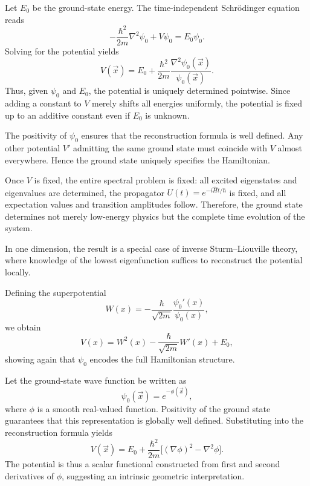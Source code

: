 Let $E_0$ be the ground-state energy. The time-independent Schr\"odinger equation reads
\begin{equation}
-\frac{\hbar^2}{2m}\nabla^2\psi_0 + V\psi_0 = E_0\psi_0.
\end{equation}
Solving for the potential yields
\begin{equation}
    \label{pot1d}
V(\vec{x}) = E_0 + \frac{\hbar^2}{2m}\frac{\nabla^2\psi_0(\vec{x})}{\psi_0(\vec{x})}.
\end{equation}
Thus, given $\psi_0$ and $E_0$, the potential is uniquely determined
pointwise. Since adding a constant to $V$ merely shifts all energies
uniformly, the potential is fixed up to an additive constant even if
$E_0$ is unknown.

The positivity of $\psi_0$ ensures that the reconstruction formula is
well defined. Any other potential $V'$ admitting the same ground 
state must coincide with $V$ almost everywhere. Hence the ground 
state uniquely specifies the Hamiltonian.

Once $V$ is fixed, the entire spectral problem is fixed: all excited
eigenstates and eigenvalues are determined, the propagator 
$U(t)=e^{-i\hat H t/\hbar}$ is fixed, and all expectation values
and transition amplitudes follow. Therefore, the ground state 
determines not merely low-energy physics but the complete time 
evolution of the system.

In one dimension, the result is a special case of inverse 
Sturm--Liouville theory, where knowledge of the lowest 
eigenfunction suffices to reconstruct the potential locally.

Defining the superpotential
\begin{equation}
W(x) = -\frac{\hbar}{\sqrt{2m}}\frac{\psi_0'(x)}{\psi_0(x)},
\end{equation}
we obtain
\begin{equation}
V(x) = W^2(x) - \frac{\hbar}{\sqrt{2m}}W'(x) + E_0,
\end{equation}
showing again that $\psi_0$ encodes the full Hamiltonian structure.


Let the ground-state wave function be written as
\begin{equation}
\psi_0(\vec{x}) = e^{-\phi(\vec{x})},
\end{equation}
where $\phi$ is a smooth real-valued function. Positivity of the ground state 
guarantees that this representation is globally well defined. Substituting 
into the reconstruction formula yields
\begin{equation}
V(\vec{x}) = E_0 + \frac{\hbar^2}{2m}\Big[(\nabla \phi)^2 - \nabla^2 \phi\Big].
\end{equation}
The potential is thus a scalar functional constructed from first 
and second derivatives of $\phi$, suggesting an intrinsic geometric interpretation.

